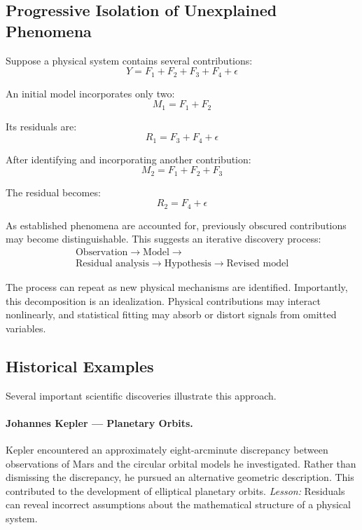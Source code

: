 \subsection{Progressive Isolation of Unexplained Phenomena}
Suppose a physical system contains several contributions: 
\begin{equation*}Y=F_1+F_2+F_3+F_4+\epsilon\end{equation*}

An initial model incorporates only two: 
\begin{equation*}M_1=F_1+F_2\end{equation*}

Its residuals are: 
\begin{equation*}R_1=F_3+F_4+\epsilon\end{equation*}

After identifying and incorporating another contribution: 
\begin{equation*}M_2=F_1+F_2+F_3\end{equation*}

The residual becomes: 
\begin{equation*}R_2=F_4+\epsilon\end{equation*}

As established phenomena are accounted for, previously obscured contributions may become distinguishable.
This suggests an iterative discovery process: 
\begin{equation*}\boxed{\begin{array}{c}\text{Observation}\rightarrow\text{Model}\rightarrow\\ \text{Residual analysis}\rightarrow\text{Hypothesis}\rightarrow\text{Revised model}\end{array}}\end{equation*}

The process can repeat as new physical mechanisms are identified.
Importantly, this decomposition is an idealization. Physical contributions may interact nonlinearly, and statistical fitting may absorb or distort signals from omitted variables.
\subsection{Historical Examples}
Several important scientific discoveries illustrate this approach.
\paragraph{Johannes Kepler --- Planetary Orbits.}
Kepler encountered an approximately eight-arcminute discrepancy between observations of Mars and the circular orbital models he investigated.
Rather than dismissing the discrepancy, he pursued an alternative geometric description.
This contributed to the development of elliptical planetary orbits.
\textit{Lesson:} Residuals can reveal incorrect assumptions about the mathematical structure of a physical system.

